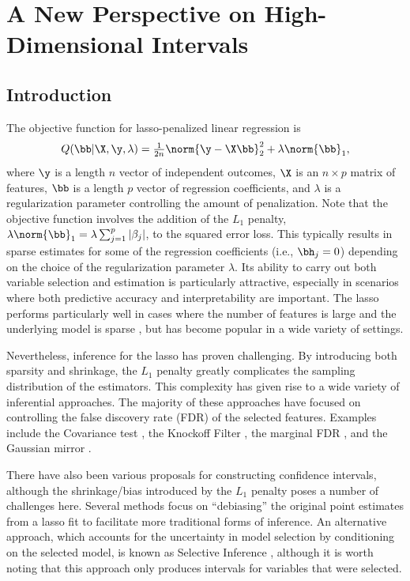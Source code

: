 \chapter{A New Perspective on High-Dimensional Intervals}\label{sec:chap2}

\section{Introduction}

The objective function for lasso-penalized linear regression \citep{Tibshirani1996} is
$$Q(\bb|\X,\y,\lambda) = \tfrac{1}{2n}\norm{\y - \X\bb}_2^2 + \lambda\norm{\bb}_1,$$
where $\y$ is a length $n$ vector of independent outcomes, $\X$ is an $n \times p$ matrix of features, $\bb$ is a length $p$ vector of regression coefficients, and $\lambda$ is a regularization parameter controlling the amount of penalization. Note that the objective function involves the addition of the $L_1$ penalty, $\lambda\norm{\bb}_1 = \lambda \sum_{j = 1}^p |\beta_j|$, to the squared error loss. This typically results in sparse estimates for some of the regression coefficients (i.e., $\bh_j = 0$) depending on the choice of the regularization parameter $\lambda$. Its ability to carry out both variable selection and estimation is particularly attractive, especially in scenarios where both predictive accuracy and interpretability are important. The lasso performs particularly well in cases where the number of features is large and the underlying model is sparse \citep{HTF2009}, but has become popular in a wide variety of settings.

Nevertheless, inference for the lasso has proven challenging. By introducing both sparsity and shrinkage, the $L_1$ penalty greatly complicates the sampling distribution of the estimators. This complexity has given rise to a wide variety of inferential approaches. The majority of these approaches have focused on controlling the false discovery rate (FDR) of the selected features. Examples include the Covariance test \citep{Lockhart2014}, the Knockoff Filter \citep{Candes2015,Candes2018}, the marginal FDR \citep{Breheny2019}, and the Gaussian mirror \citep{Xing2023}.

There have also been various proposals for constructing confidence intervals, although the shrinkage/bias introduced by the $L_1$ penalty poses a number of challenges here. Several methods \citep{ZhangZhang2014, Javanmard2014} focus on ``debiasing'' the original point estimates from a lasso fit to facilitate more traditional forms of inference. An alternative approach, which accounts for the uncertainty in model selection by conditioning on the selected model, is known as Selective Inference \citep{Lee2016}, although it is worth noting that this approach only produces intervals for variables that were selected.

